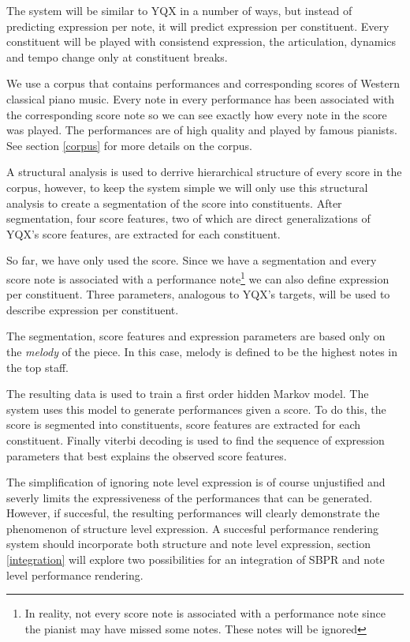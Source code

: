 \documentclass[a4paper,10pt]{article}
\begin{document}

The system will be similar to YQX in a number of ways, but instead of predicting expression per note, it will predict expression per constituent. Every constituent will be played with consistend expression, the articulation, dynamics and tempo change only at constituent breaks.

We use a corpus that contains performances and corresponding scores of Western classical piano music. Every note in every performance has been associated with the corresponding score note so we can see exactly how every note in the score was played. The performances are of high quality and played by famous pianists. See section \ref{corpus} for more details on the corpus.

A structural analysis is used to derrive hierarchical structure of every score in the corpus, however, to keep the system simple we will only use this structural analysis to create a segmentation of the score into constituents. After segmentation, four score features, two of which are direct generalizations of YQX's score features, are extracted for each constituent. 

So far, we have only used the score. Since we have a segmentation and every score note is associated with a performance note\footnote{In reality, not every score note is associated with a performance note since the pianist may have missed some notes. These notes will be ignored} we can also define expression per constituent. Three parameters, analogous to YQX's targets, will be used to describe expression per constituent.

The segmentation, score features and expression parameters are based only on the \textit{melody} of the piece. In this case, melody is defined to be the highest notes in the top staff.

The resulting data is used to train a first order hidden Markov model. The system uses this model to generate performances given a score. To do this, the score is segmented into constituents, score features are extracted for each constituent. Finally viterbi decoding is used to find the sequence of expression parameters that best explains the observed score features.

The simplification of ignoring note level expression is of course unjustified and severly limits the expressiveness of the performances that can be generated. However, if succesful, the resulting performances will clearly demonstrate the phenomenon of structure level expression. A succesful performance rendering system should incorporate both structure and note level expression, section \ref{integration} will explore two possibilities for an integration of SBPR and note level performance rendering.
\end{document}
